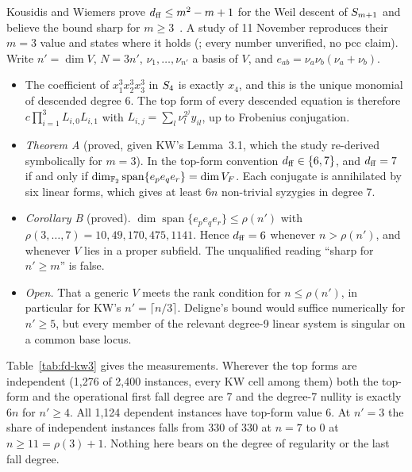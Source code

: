 Kousidis and Wiemers prove $d_{\rm ff}\le m^2-m+1$ for the Weil descent of
$S_{m+1}$ and believe the bound sharp for $m\ge3$~\cite{kousidis2019}. A
study of 11 November reproduces their $m=3$ value and states where it holds
(; every
number unverified, no pcc claim). Write $n'=\dim V$, $N=3n'$, $\nu_1,\ldots,\nu_{n'}$
a basis of $V$, and $e_{ab}=\nu_a\nu_b(\nu_a+\nu_b)$.
\begin{itemize}
\item The coefficient of $x_1^3x_2^3x_3^3$ in $S_{4}$ is exactly $x_4$, and
  this is the unique monomial of descended degree 6. The top form of every
  descended equation is therefore $c\prod_{i=1}^3L_{i,0}L_{i,1}$ with
  $L_{i,j}=\sum_l\nu_l^{2^j}y_{il}$, up to Frobenius conjugation.
\item \emph{Theorem A} (proved, given KW's Lemma~3.1, which the study
  re-derived symbolically for $m=3$). In the top-form convention
  $d_{\rm ff}\in\{6,7\}$, and $d_{\rm ff}=7$ if and only if
  $\dim_{\mathbb{F}_2}\operatorname{span}\{e_pe_qe_r\}=\dim V_F$. Each conjugate is
  annihilated by six linear forms, which gives at least $6n$ non-trivial
  syzygies in degree 7.
\item \emph{Corollary B} (proved). $\dim\operatorname{span}\{e_pe_qe_r\}\le\rho(n')$
  with $\rho(3,\ldots,7)=10,49,170,475,1141$. Hence $d_{\rm ff}=6$ whenever
  $n>\rho(n')$, and whenever $V$ lies in a proper subfield. The unqualified
  reading ``sharp for $n'\ge m$'' is false.
\item \emph{Open.} That a generic $V$ meets the rank condition for
  $n\le\rho(n')$, in particular for KW's $n'=\lceil n/3\rceil$. Deligne's
  bound would suffice numerically for $n'\ge5$, but every member of the
  relevant degree-9 linear system is singular on a common base locus.
\end{itemize}
Table~\ref{tab:fd-kw3} gives the measurements. Wherever the top forms are
independent (1{,}276 of 2{,}400 instances, every KW cell among them) both
the top-form and the operational first fall degree are 7 and the degree-7
nullity is exactly $6n$ for $n'\ge4$. All 1{,}124 dependent instances have
top-form value 6. At $n'=3$ the share of independent instances falls from
330 of 330 at $n=7$ to 0 at $n\ge11=\rho(3)+1$. Nothing here bears on the
degree of regularity or the last fall degree.

